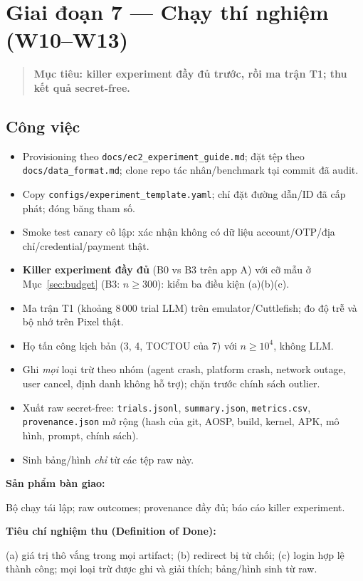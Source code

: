 \documentclass[11pt,a4paper]{article}
\newcommand{\code}[1]{\texttt{\small #1}}
\newenvironment{phasebox}
  {\begin{quote}\color{shblue}\bfseries}
  {\end{quote}}
\newcommand{\dod}[1]{\par\vspace{0.3em}\noindent\textbf{\color{shgreen}Tiêu chí nghiệm thu (Definition of Done):}\par\vspace{0.2em}\noindent #1}
\newcommand{\deliverable}[1]{\par\vspace{0.3em}\noindent\textbf{\color{shblue}Sản phẩm bàn giao:}\par\vspace{0.2em}\noindent #1}
\begin{document}
\section{Giai đoạn 7 --- Chạy thí nghiệm (W10--W13)}

\begin{phasebox}Mục tiêu: killer experiment đầy đủ trước, rồi ma trận T1; thu kết quả secret-free.\end{phasebox}

\subsection{Công việc}

\begin{itemize}
  \item Provisioning theo \code{docs/ec2\_experiment\_guide.md}; đặt tệp theo \code{docs/data\_format.md}; clone repo tác nhân/benchmark tại commit đã audit.
  \item Copy \code{configs/experiment\_template.yaml}; chỉ đặt đường dẫn/ID đã cấp phát; đóng băng tham số.
  \item Smoke test canary cô lập: xác nhận không có dữ liệu account/OTP/địa chỉ/credential/payment thật.
  \item \textbf{Killer experiment đầy đủ} (B0 vs B3 trên app A) với cỡ mẫu ở Mục~\ref{sec:budget} (B3: $n \ge 300$): kiểm ba điều kiện (a)(b)(c).
  \item Ma trận T1 (khoảng $8\,000$ trial LLM) trên emulator/Cuttlefish; đo độ trễ và bộ nhớ trên Pixel thật.
  \item Họ tấn công kịch bản (3, 4, TOCTOU của 7) với $n \ge 10^4$, không LLM.
  \item Ghi \emph{mọi} loại trừ theo nhóm (agent crash, platform crash, network outage, user cancel, định danh không hỗ trợ); chặn trước chính sách outlier.
  \item Xuất raw secret-free: \code{trials.jsonl}, \code{summary.json}, \code{metrics.csv}, \code{provenance.json} mở rộng (hash của git, AOSP, build, kernel, APK, mô hình, prompt, chính sách).
  \item Sinh bảng/hình \emph{chỉ} từ các tệp raw này.
\end{itemize}

\deliverable{Bộ chạy tái lập; raw outcomes; provenance đầy đủ; báo cáo killer experiment.}

\dod{(a) giá trị thô vắng trong mọi artifact; (b) redirect bị từ chối; (c) login hợp lệ thành công; mọi loại trừ được ghi và giải thích; bảng/hình sinh từ raw.}
\end{document}
